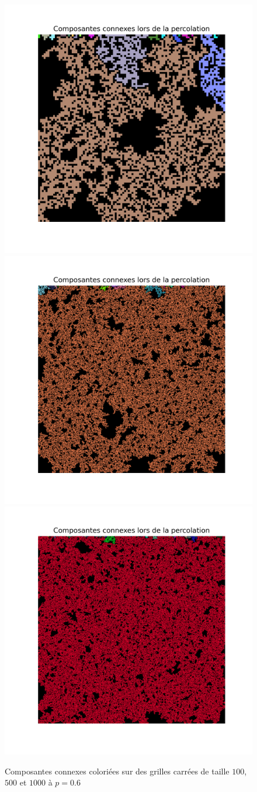 \documentclass[11pt,a4paper]{article}
\begin{document}
\begin{figure}[htp]

\centering
\includegraphics[width=.3333\textwidth]{./Pictures/cc100.png}\hfill
\includegraphics[width=.3333\textwidth]{./Pictures/cc500.png}\hfill
\includegraphics[width=.3333\textwidth]{./Pictures/cc1000.png}

\caption{Composantes connexes coloriées sur des grilles carrées de taille $100$, $500$ et $1000$ à $p=0.6$}
\label{fig:figure3}

\end{figure}

\newpage
\printbibliography[heading=bibintoc, title={Références}]
\end{document}
